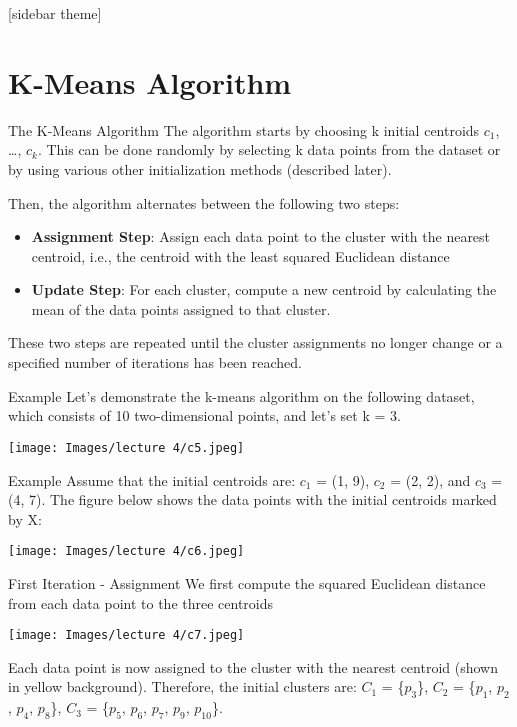 \documentclass[xcolor=dvipsnames, 9pt]{beamer} %
\begin{document}
[sidebar theme]
\section{K-Means Algorithm}

\begin{frame}{The K-Means Algorithm}
The algorithm starts by choosing k initial centroids $c_{1}$, …, $c_{k}$. This can be done randomly by selecting k data points from the dataset or by using various other initialization methods (described later).
\vspace{5pt}

Then, the algorithm alternates between the following two steps:
\begin{itemize}
    \item \textbf{Assignment Step}: Assign each data point to the cluster with the nearest centroid, i.e., the centroid with the least squared Euclidean distance
    \item \textbf{Update Step}: For each cluster, compute a new centroid by calculating the mean of the data points assigned to that cluster.
\end{itemize}
These two steps are repeated until the cluster assignments no longer change or a specified number of iterations has been reached.
\end{frame}

\begin{frame}{Example}
Let’s demonstrate the k-means algorithm on the following dataset, which consists of 10 two-dimensional points, and let's set k = 3.
\begin{center}
\texttt{[image: Images/lecture 4/c5.jpeg]}
\end{center}
\end{frame}

\begin{frame}{Example}
Assume that the initial centroids are: $c_{1}$ = (1, 9), $c_{2}$ = (2, 2), and $c_{3}$ = (4, 7). The figure below shows the data points with the initial centroids marked by X:
\begin{center}
\texttt{[image: Images/lecture 4/c6.jpeg]} 
\end{center}
\end{frame}

\begin{frame}{First Iteration - Assignment}
We first compute the squared Euclidean distance from each data point to the three centroids
\begin{center}
\texttt{[image: Images/lecture 4/c7.jpeg]} 
\end{center}
Each data point is now assigned to the cluster with the nearest centroid (shown in yellow background). Therefore, the initial clusters are: $C_{1}$ = \{$p_{3}$\}, $C_{2}$ = \{$p_{1}$, $p_{2}$, $p_{4}$, $p_{8}$\}, $C_{3}$ = \{$p_{5}$, $p_{6}$, $p_{7}$, $p_{9}$, $p_{10}$\}.
\end{frame}
\end{document}
